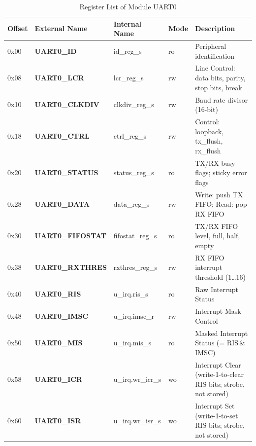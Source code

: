 \begin{table}[H]
\caption{Register List of Module UART0}
\label{tab:asUartPer03}
\centering
\begin{tabularx}{\textwidth}{|l |l |l |l |X|}
  \hline
  Offset & External Name & Internal Name & Mode & Description \\
  \hline
  \hline
  0x00 & \textbf{UART0\_ID}       & id\_reg\_s       & ro   & Peripheral identification \\
  \hline
  0x08 & \textbf{UART0\_LCR}      & lcr\_reg\_s      & rw   & Line Control: data bits, parity, stop bits, break \\
  \hline
  0x10 & \textbf{UART0\_CLKDIV}   & clkdiv\_reg\_s   & rw   & Baud rate divisor (16-bit) \\
  \hline
  0x18 & \textbf{UART0\_CTRL}     & ctrl\_reg\_s     & rw   & Control: loopback, tx\_flush, rx\_flush \\
  \hline
  0x20 & \textbf{UART0\_STATUS}   & status\_reg\_s   & ro   & TX/RX busy flags; sticky error flags \\
  \hline
  0x28 & \textbf{UART0\_DATA}     & data\_reg\_s     & rw   & Write: push TX FIFO; Read: pop RX FIFO \\
  \hline
  0x30 & \textbf{UART0\_FIFOSTAT} & fifostat\_reg\_s & ro   & TX/RX FIFO level, full, half, empty \\
  \hline
  0x38 & \textbf{UART0\_RXTHRES}  & rxthres\_reg\_s  & rw   & RX FIFO interrupt threshold (1\ldots16) \\
  \hline
  0x40 & \textbf{UART0\_RIS}      & u\_irq.ris\_s      & ro   & Raw Interrupt Status \\
  \hline
  0x48 & \textbf{UART0\_IMSC}     & u\_irq.imsc\_r     & rw   & Interrupt Mask Control \\
  \hline
  0x50 & \textbf{UART0\_MIS}      & u\_irq.mis\_s      & ro   & Masked Interrupt Status (= RIS\,\&\,IMSC) \\
  \hline
  0x58 & \textbf{UART0\_ICR}      & u\_irq.wr\_icr\_s  & wo   & Interrupt Clear (write-1-to-clear RIS bits; strobe, not stored) \\
  \hline
  0x60 & \textbf{UART0\_ISR}      & u\_irq.wr\_isr\_s  & wo   & Interrupt Set (write-1-to-set RIS bits; strobe, not stored) \\
  \hline
\end{tabularx}
\end{table}

